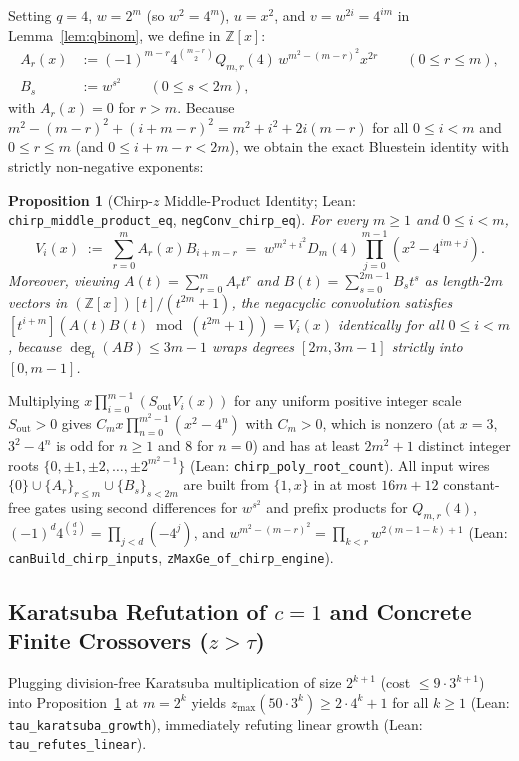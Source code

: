 \documentclass[11pt]{article}
\newtheorem{proposition}[theorem]{Proposition}
\newcommand{\Z}{\mathbb{Z}}
\newcommand{\code}[1]{\texttt{#1}}
\newcommand{\zmax}{z_{\max}}
\begin{document}
Setting $q = 4$, $w = 2^m$ (so $w^2 = 4^m$), $u = x^2$, and $v = w^{2i} = 4^{im}$ in Lemma~\ref{lem:qbinom}, we define in $\Z[x]$:
\begin{align*}
  A_r(x) &:= (-1)^{m-r} 4^{\binom{m-r}{2}} Q_{m,r}(4)\, w^{m^2 - (m-r)^2} x^{2r} \qquad (0 \le r \le m), \\
  B_s &:= w^{s^2} \qquad (0 \le s < 2m),
\end{align*}
with $A_r(x) = 0$ for $r > m$. Because $m^2 - (m-r)^2 + (i + m - r)^2 = m^2 + i^2 + 2i(m-r)$ for all $0 \le i < m$ and $0 \le r \le m$ (and $0 \le i + m - r < 2m$), we obtain the exact Bluestein identity with strictly non-negative exponents:

\begin{proposition}[Chirp-$z$ Middle-Product Identity; Lean: \code{chirp\_middle\_product\_eq}, \code{negConv\_chirp\_eq}]\label{prop:chirp}
For every $m \ge 1$ and $0 \le i < m$,
\[
  V_i(x) \;:=\; \sum_{r=0}^m A_r(x) B_{i+m-r} \;=\; w^{m^2 + i^2} D_m(4) \prod_{j=0}^{m-1} (x^2 - 4^{im+j}).
\]
Moreover, viewing $A(t) = \sum_{r=0}^m A_r t^r$ and $B(t) = \sum_{s=0}^{2m-1} B_s t^s$ as length-$2m$ vectors in $(\Z[x])[t]/(t^{2m} + 1)$, the negacyclic convolution satisfies $[t^{i+m}](A(t)B(t) \bmod (t^{2m} + 1)) = V_i(x)$ identically for all $0 \le i < m$, because $\deg_t(AB) \le 3m - 1$ wraps degrees $[2m, 3m-1]$ strictly into $[0, m-1]$.
\end{proposition}

Multiplying $x \prod_{i=0}^{m-1} (S_{\mathrm{out}} V_i(x))$ for any uniform positive integer scale $S_{\mathrm{out}} > 0$ gives $C_m x \prod_{n=0}^{m^2-1} (x^2 - 4^n)$ with $C_m > 0$, which is nonzero (at $x = 3$, $3^2 - 4^n$ is odd for $n \ge 1$ and $8$ for $n = 0$) and has at least $2m^2 + 1$ distinct integer roots $\{0, \pm 1, \pm 2, \dots, \pm 2^{m^2-1}\}$ (Lean: \code{chirp\_poly\_root\_count}). All input wires $\{0\} \cup \{A_r\}_{r \le m} \cup \{B_s\}_{s < 2m}$ are built from $\{1, x\}$ in at most $16m + 12$ constant-free gates using second differences for $w^{s^2}$ and prefix products for $Q_{m,r}(4)$, $(-1)^d 4^{\binom{d}{2}} = \prod_{j<d}(-4^j)$, and $w^{m^2-(m-r)^2} = \prod_{k<r} w^{2(m-1-k)+1}$ (Lean: \code{canBuild\_chirp\_inputs}, \code{zMaxGe\_of\_chirp\_engine}).

\subsection{Karatsuba Refutation of $c = 1$ and Concrete Finite Crossovers ($z > \tau$)}
Plugging division-free Karatsuba multiplication of size $2^{k+1}$ (cost $\le 9 \cdot 3^{k+1}$) into Proposition~\ref{prop:chirp} at $m = 2^k$ yields $\zmax(50 \cdot 3^k) \ge 2 \cdot 4^k + 1$ for all $k \ge 1$ (Lean: \code{tau\_karatsuba\_growth}), immediately refuting linear growth (Lean: \code{tau\_refutes\_linear}).
\end{document}

